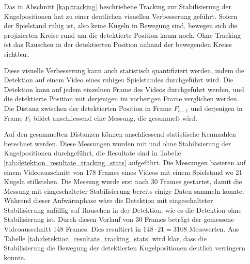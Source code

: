 Das in Abschnitt \ref{kap:tracking} beschriebene Tracking zur Stabilisierung der Kugelpositionen hat zu einer deutlichen
visuellen Verbesserung geführt.
Sofern der Spielstand ruhig ist, also keine Kugeln in Bewegung sind, bewegen sich die
projizierten Kreise rund um die detektierte Position kaum noch.
Ohne Tracking ist das Rauschen in der detektierten Position anhand der bewegenden Kreise sichtbar.

Diese visuelle Verbesserung kann auch statistisch quantifiziert werden, indem die Detektion auf einem Video eines
ruhigen Spielstandes durchgeführt wird. Die Detektion kann auf jedem einzelnen Frame des Videos durchgeführt werden, und
die detektierte Position mit derjenigen im vorherigen Frame verglichen werden.
Die Distanz zwischen der detektierten Position in Frame $F_{t-1}$ und derjenigen in Frame $F_{t}$ bildet anschliessend
eine Messung, die gesammelt wird.

Auf den gesammelten Distanzen können anschliessend statistische Kennzahlen berechnet werden.
Diese Messungen wurden mit und ohne Stabilisierung der Kugelpositionen durchgeführt, die Resultate sind in Tabelle \ref{tab:detektion_resultate_tracking_stats} aufgeführt.
Die Messungen basieren auf einem Videoausschnitt von 178 Frames eines Videos mit einem Spielstand wo 21 Kugeln stillstehen.
Die Messung wurde erst nach 30 Frames gestartet, damit die Messung mit eingeschalteter Stabilisierung bereits einige
Daten sammeln konnte.
Während dieser Aufwärmphase wäre die Detektion mit eingeschalteter Stabilisierung anfällig auf Rauschen in der Detektion,
wie es die Detektion ohne Stabilisierung ist.
Durch diesen Vorlauf von 30 Frames beträgt der gemessene Videoausschnitt 148 Frames.
Dies resultiert in $148 \cdot 21 = 3108$ Messwerten.
Aus Tabelle \ref{tab:detektion_resultate_tracking_stats} wird klar, dass die Stabilisierung die Bewegung der
detektierten Kugelpositionen deutlich verringern konnte.

